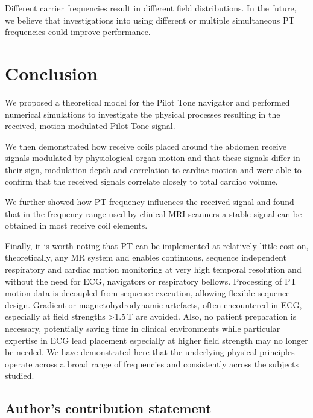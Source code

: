 \documentclass[
]{article}
\begin{document}
Different carrier frequencies result in different field distributions. In the future, we believe that investigations into using different or multiple simultaneous PT frequencies could improve performance.

\section{Conclusion}\label{conclusion-1}

We proposed a theoretical model for the Pilot Tone navigator and
performed numerical simulations to investigate the physical processes
resulting in the received, motion modulated Pilot Tone signal.

We then demonstrated how receive coils placed around the abdomen receive
signals modulated by physiological organ motion and that these signals
differ in their sign, modulation depth and correlation to cardiac motion
and were able to confirm that the received signals correlate closely to
total cardiac volume.

We further showed how PT frequency influences the received signal and
found that in the frequency range used by clinical MRI scanners a stable
signal can be obtained in most receive coil elements.

Finally, it is worth noting that PT can be implemented at relatively
little cost on, theoretically, any MR system and enables continuous,
sequence independent respiratory and cardiac motion monitoring at very
high temporal resolution and without the need for ECG, navigators or
respiratory bellows. Processing of PT motion data \cite{Bacher2017CardiacStudy, Bacher2020PerformanceFramework, Chen2023CardiacStudy} is
decoupled from sequence execution, allowing flexible sequence design.
Gradient or magnetohydrodynamic artefacts, often encountered in ECG,
especially at field strengths \textgreater1.5\,T are avoided. Also, no
patient preparation is necessary, potentially saving time in clinical
environments while particular expertise in ECG lead placement especially
at higher field strength may no longer be needed. We have demonstrated
here that the underlying physical principles operate across a broad range of
frequencies and consistently across the subjects studied.

\subsection{Author's contribution
statement}\label{authors-contribution-statement}
\end{document}

